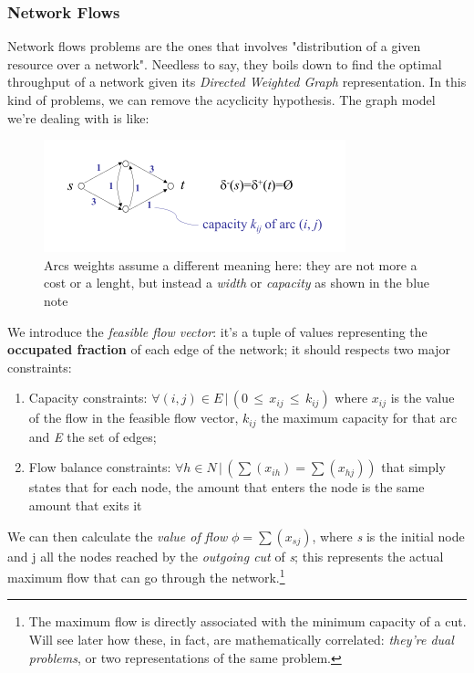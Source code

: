         \subsubsection{Network Flows}
            Network flows problems are the ones that involves "distribution of a given resource over a network". Needless to say, they boils down to find the optimal throughput of a network given its \textit{Directed Weighted Graph} representation. In this kind of problems, we can remove the acyclicity hypothesis. The graph model we're dealing with is like:
            \begin{figure}[H]
                \centering
                \includegraphics[width = \textwidth]{./images/Flows.png}
                \caption{Arcs weights assume a different meaning here: they are not more a cost or a lenght, but instead a \textit{width} or \textit{capacity} as shown in the blue note}
            \end{figure}
            We introduce the \textit{feasible flow vector}: it's a tuple of values representing the \textbf{occupated fraction} of each edge of the network; it should respects two major constraints:
            \begin{enumerate}
                \item Capacity constraints: $\forall (i, j) \in E\, |\, (0\, \leq\, x_{ij}\, \leq\, k_{ij} )$ where $x_{ij}$ is the value of the flow in the feasible flow vector, $k_{ij}$ the maximum capacity for that arc and \emph{E} the set of edges;
                \item Flow balance constraints: $\forall h \in N\, |\, (\sum(x_{ih}) = \sum(x_{hj}))$ that simply states that for each node, the amount that enters the node is the same amount that exits it
            \end{enumerate}
            We can then calculate the \textit{value of flow} $\phi = \sum(x_{sj})$, where \emph{s} is the initial node and j all the nodes reached by the \textit{outgoing cut} of \emph{s}; this represents the actual maximum flow that can go through the network.\footnote{The maximum flow is directly associated with the minimum capacity of a cut. Will see later how these, in fact, are mathematically correlated: \textit{they're dual problems}, or two representations of the same problem.}

